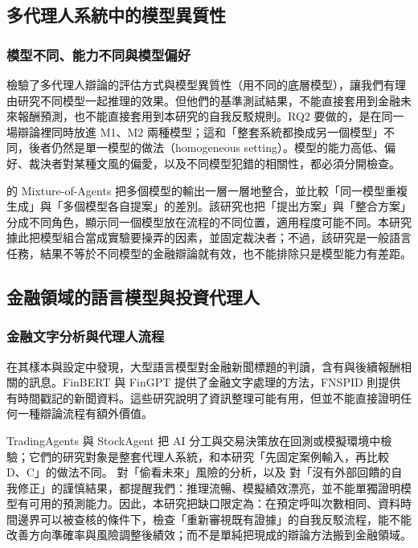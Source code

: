 \documentclass[12pt,a4paper]{article}
\numberwithin{table}{section}
\numberwithin{figure}{section}
\newcommand{\grp}[1]{\textsf{#1}}
\begin{document}
\subsection{多代理人系統中的模型異質性}

\subsubsection{模型不同、能力不同與模型偏好}

\citet{zhang2025stop} 檢驗了多代理人辯論的評估方式與模型異質性（用不同的底層模型），讓我們有理由研究不同模型一起推理的效果。但他們的基準測試結果，不能直接套用到金融未來報酬預測，也不能直接套用到本研究的自我反駁規則。RQ2 要做的，是在同一場辯論裡同時放進 M1、M2 兩種模型；這和「整套系統都換成另一個模型」不同，後者仍然是單一模型的做法（homogeneous setting）。模型的能力高低、偏好、裁決者對某種文風的偏愛，以及不同模型犯錯的相關性，都必須分開檢查。

\citet{wang2024moa} 的 Mixture-of-Agents 把多個模型的輸出一層一層地整合，並比較「同一模型重複生成」與「多個模型各自提案」的差別。該研究也把「提出方案」與「整合方案」分成不同角色，顯示同一個模型放在流程的不同位置，適用程度可能不同。本研究據此把模型組合當成實驗要操弄的因素，並固定裁決者；不過，該研究是一般語言任務，結果不等於不同模型的金融辯論就有效，也不能排除只是模型能力有差距。

\subsection{金融領域的語言模型與投資代理人}

\subsubsection{金融文字分析與代理人流程}
\citet{lopezlira2023chatgpt} 在其樣本與設定中發現，大型語言模型對金融新聞標題的判讀，含有與後續報酬相關的訊息。FinBERT \citep{araci2019finbert} 與 FinGPT \citep{liu2023fingpt} 提供了金融文字處理的方法，FNSPID \citep{dong2024fnspid} 則提供有時間戳記的新聞資料。這些研究說明了資訊整理可能有用，但並不能直接證明任何一種辯論流程有額外價值。

TradingAgents \citep{xiao2024tradingagents} 與 StockAgent \citep{zhang2024stockagent} 把 AI 分工與交易決策放在回測或模擬環境中檢驗；它們的研究對象是整套代理人系統，和本研究「先固定案例輸入，再比較 \grp{D}、\grp{C}」的做法不同。\citet{glasserman2023lookahead} 對「偷看未來」風險的分析，以及 \citet{huang2024selfcorrect} 對「沒有外部回饋的自我修正」的謹慎結果，都提醒我們：推理流暢、模擬績效漂亮，並不能單獨證明模型有可用的預測能力。因此，本研究把缺口限定為：在預定呼叫次數相同、資料時間邊界可以被查核的條件下，檢查「重新審視既有證據」的自我反駁流程，能不能改善方向準確率與風險調整後績效；而不是單純把現成的辯論方法搬到金融領域。
\end{document}
